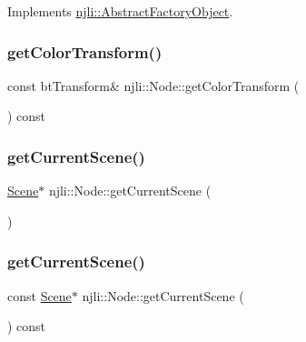 Implements \mbox{\hyperlink{classnjli_1_1_abstract_factory_object_af4151e41b80d5bc3fc42822c67fc2278}{njli\+::\+Abstract\+Factory\+Object}}.

\mbox{\label{classnjli_1_1_node_a05480357b853195997e5ef255a6f2e70}} 
\subsubsection{\texorpdfstring{get\+Color\+Transform()}{getColorTransform()}}
{\footnotesize\ttfamily const bt\+Transform\& njli\+::\+Node\+::get\+Color\+Transform (\begin{DoxyParamCaption}{ }\end{DoxyParamCaption}) const}

\mbox{\label{classnjli_1_1_node_a5cf39de8bc22ee961717ceee0a2c40c8}} 
\subsubsection{\texorpdfstring{get\+Current\+Scene()}{getCurrentScene()}\hspace{0.1cm}{\footnotesize\ttfamily [1/2]}}
{\footnotesize\ttfamily \mbox{\hyperlink{classnjli_1_1_scene}{Scene}}$\ast$ njli\+::\+Node\+::get\+Current\+Scene (\begin{DoxyParamCaption}{ }\end{DoxyParamCaption})\hspace{0.3cm}{\ttfamily [protected]}}

\mbox{\label{classnjli_1_1_node_abd42c66830a9afad1acb368c98c5ae50}} 
\subsubsection{\texorpdfstring{get\+Current\+Scene()}{getCurrentScene()}\hspace{0.1cm}{\footnotesize\ttfamily [2/2]}}
{\footnotesize\ttfamily const \mbox{\hyperlink{classnjli_1_1_scene}{Scene}}$\ast$ njli\+::\+Node\+::get\+Current\+Scene (\begin{DoxyParamCaption}{ }\end{DoxyParamCaption}) const\hspace{0.3cm}{\ttfamily [protected]}}

